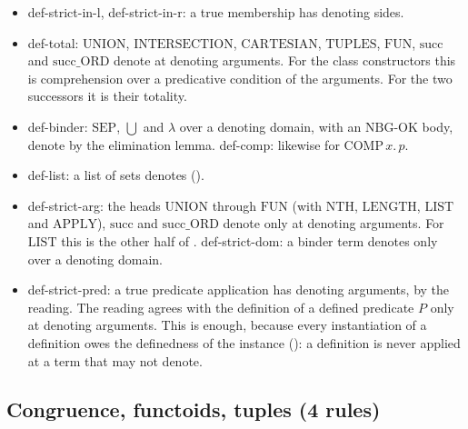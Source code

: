 \begin{itemize}
\item def-strict-in-l, def-strict-in-r: a true membership has denoting
  sides.
\item def-total: $\mathrm{UNION}$, $\mathrm{INTERSECTION}$,
  $\mathrm{CARTESIAN}$, $\mathrm{TUPLES}$, $\mathrm{FUN}$, $\mathrm{succ}$
  and $\mathrm{succ\_ORD}$ denote at denoting arguments.  For the class
  constructors this is comprehension over a predicative condition of the
  arguments.  For the two successors it is their totality.
\item def-binder: $\mathrm{SEP}$, $\bigcup$ and $\lambda$ over a
  denoting domain, with an $\mathrm{NBG\text{-}OK}$ body, denote by the
  elimination lemma.  def-comp: likewise for $\mathrm{COMP}\,x.\,p$.
\item def-list: a list of sets denotes ().
\item def-strict-arg: the heads $\mathrm{UNION}$ through $\mathrm{FUN}$
  (with $\mathrm{NTH}$, $\mathrm{LENGTH}$, $\mathrm{LIST}$ and
  $\mathrm{APPLY}$), $\mathrm{succ}$ and $\mathrm{succ\_ORD}$ denote only
  at denoting arguments.  For $\mathrm{LIST}$ this is the other half of
  .  def-strict-dom: a binder term denotes only over a denoting
  domain.
\item def-strict-pred: a true predicate application has denoting
  arguments, by the reading.  The reading agrees with the definition of
  a defined predicate $P$ only at denoting arguments.  This is enough,
  because every instantiation of a definition owes the definedness of the
  instance (): a definition is never applied at a term that may
  not denote.
\end{itemize}

\subsection{Congruence, functoids, tuples (4 rules)}

